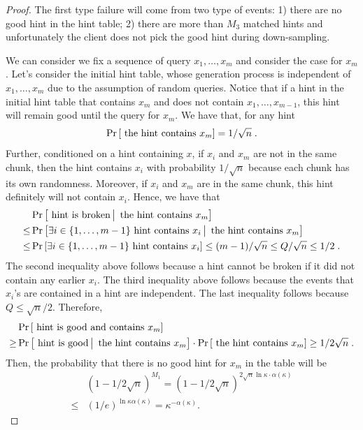 \begin{proof}
    The first type failure will come from two type of events: 1) there are no good hint in the hint table; 2) there are more than $M_3$ matched hints and unfortunately the client does not pick the good hint during down-sampling.
    
    We can consider we fix a sequence of query $x_1,\dots,x_m$ and consider the case for $x_m$. 
    Let's consider the initial hint table, whose generation process is independent of $x_1,\dots,x_m$ due to the assumption of random queries.
    Notice that if a hint in the initial hint table that contains $x_m$ and does not contain $x_1,\dots,x_{m-1}$, this hint will remain good until the query for $x_m$. We have that, for any hint
    \begin{displaymath}
        \Pr\left[\text{ the hint contains }x_m \right]=1/\sqrt{n}\;.
    \end{displaymath}
    Further, conditioned on a hint containing $x$, if $x_i$ and $x_m$ are not in the same chunk, then the hint contains $x_i$ with probability $1/\sqrt{n}$ because each chunk has its own randomness.
    Moreover, if $x_i$ and $x_m$ are in the same chunk, this hint definitely will not contain $x_i$.
    Hence, we have that 
    \begin{align*}
        &\Pr\left[\text{ hint is broken} \,\big|\, \text{ the hint contains }x_m \right]\\
        \leq& \Pr\left[\exists i\in \{1,\ldots,m-1\}\text{ hint contains }x_i \,\big|\, \text{ the hint contains }x_m \right]\\
        \leq &\Pr\left[\exists i\in \{1,\ldots,m-1\}\text{ hint contains }x_i  \right]\leq (m-1)/\sqrt{n}\leq Q/\sqrt{n}\leq 1/2\;.
    \end{align*}
    The second inequality above follows because a hint cannot be broken if it did not contain any earlier $x_i$. The third inequality above follows because the events that $x_i$'s are contained in a hint are independent. 
    The last inequality follows because $Q\le \sqrt{n}/2$.
    Therefore, 
    \begin{align*}
        &\Pr\left[\text{ hint is good and contains }x_m \right]\\
        \geq &\Pr\left[\text{ hint is good} \,\big|\, \text{ the hint contains }x_m \right]\cdot \Pr\left[\text{ the hint contains }x_m \right] \geq 1/2\sqrt{n}\;.
    \end{align*}
    Then, the probability that there is no good hint for $x_m$ in the table will be
    \begin{align*}
        & \left(1-1/2\sqrt{n}\right)^{M_1}  = \left(1-1/2\sqrt{n}\right)^{2\sqrt{n}\ln \kappa\cdot \alpha(\kappa)}  \\
        \le & \left(1/e\right)^{\ln \kappa \alpha(\kappa)}  = \kappa^{-\alpha(\kappa)}.
    \end{align*}
    

\end{proof}
